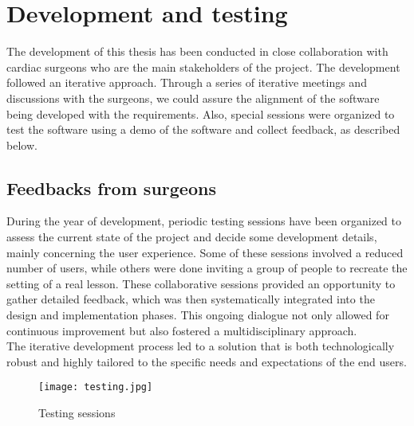 \chapter{Development and testing}
\label{chp:testing}
\noindent
The development of this thesis has been conducted in close collaboration with cardiac surgeons who are the main stakeholders of the project.
The development followed an iterative approach. Through a series of iterative meetings and discussions with the surgeons, we could assure the alignment of the software being developed with the requirements.
Also, special sessions were organized to test the software using a demo of the software and collect feedback, as described below.

\section{Feedbacks from surgeons}
\noindent
During the year of development, periodic testing sessions have been organized to assess the current state of the project and decide some development details, mainly concerning the user experience. 
Some of these sessions involved a reduced number of users, while others were done inviting a group of people to recreate the setting of a real lesson.
These collaborative sessions provided an opportunity to gather detailed feedback, which was then systematically integrated into the design and implementation phases.
This ongoing dialogue not only allowed for continuous improvement but also fostered a multidisciplinary approach.\\
The iterative development process led to a solution that is both technologically robust and highly tailored to the specific needs and expectations of the end users.\\


\begin{figure}[ht]
  \centering
  \texttt{[image: testing.jpg]}
  \caption{Testing sessions}
  \label{fig:testing}
\end{figure}

